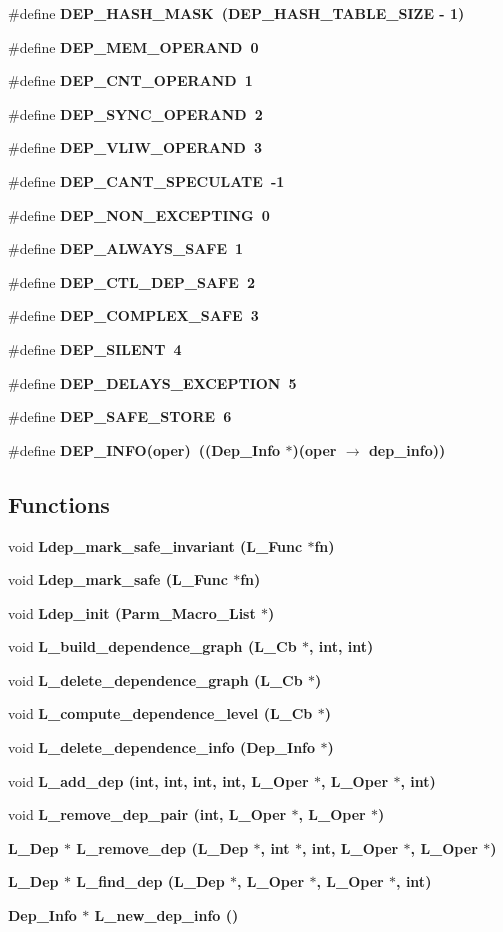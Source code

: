 \begin{CompactItemize}
\#define \bf{DEP\_\-HASH\_\-MASK}~(DEP\_\-HASH\_\-TABLE\_\-SIZE - 1)
\item 
\#define \bf{DEP\_\-MEM\_\-OPERAND}~0
\item 
\#define \bf{DEP\_\-CNT\_\-OPERAND}~1
\item 
\#define \bf{DEP\_\-SYNC\_\-OPERAND}~2
\item 
\#define \bf{DEP\_\-VLIW\_\-OPERAND}~3
\item 
\#define \bf{DEP\_\-CANT\_\-SPECULATE}~-1
\item 
\#define \bf{DEP\_\-NON\_\-EXCEPTING}~0
\item 
\#define \bf{DEP\_\-ALWAYS\_\-SAFE}~1
\item 
\#define \bf{DEP\_\-CTL\_\-DEP\_\-SAFE}~2
\item 
\#define \bf{DEP\_\-COMPLEX\_\-SAFE}~3
\item 
\#define \bf{DEP\_\-SILENT}~4
\item 
\#define \bf{DEP\_\-DELAYS\_\-EXCEPTION}~5
\item 
\#define \bf{DEP\_\-SAFE\_\-STORE}~6
\item 
\#define \bf{DEP\_\-INFO}(oper)~((\bf{Dep\_\-Info} $\ast$)(oper $\rightarrow$ dep\_\-info))
\end{CompactItemize}
\subsection*{Functions}
\begin{CompactItemize}
\item 
void \bf{Ldep\_\-mark\_\-safe\_\-invariant} (L\_\-Func $\ast$fn)
\item 
void \bf{Ldep\_\-mark\_\-safe} (L\_\-Func $\ast$fn)
\item 
void \bf{Ldep\_\-init} (\bf{Parm\_\-Macro\_\-List} $\ast$)
\item 
void \bf{L\_\-build\_\-dependence\_\-graph} (L\_\-Cb $\ast$, int, int)
\item 
void \bf{L\_\-delete\_\-dependence\_\-graph} (L\_\-Cb $\ast$)
\item 
void \bf{L\_\-compute\_\-dependence\_\-level} (L\_\-Cb $\ast$)
\item 
void \bf{L\_\-delete\_\-dependence\_\-info} (\bf{Dep\_\-Info} $\ast$)
\item 
void \bf{L\_\-add\_\-dep} (int, int, int, int, L\_\-Oper $\ast$, L\_\-Oper $\ast$, int)
\item 
void \bf{L\_\-remove\_\-dep\_\-pair} (int, L\_\-Oper $\ast$, L\_\-Oper $\ast$)
\item 
\bf{L\_\-Dep} $\ast$ \bf{L\_\-remove\_\-dep} (\bf{L\_\-Dep} $\ast$, int $\ast$, int, L\_\-Oper $\ast$, L\_\-Oper $\ast$)
\item 
\bf{L\_\-Dep} $\ast$ \bf{L\_\-find\_\-dep} (\bf{L\_\-Dep} $\ast$, L\_\-Oper $\ast$, L\_\-Oper $\ast$, int)
\item 
\bf{Dep\_\-Info} $\ast$ \bf{L\_\-new\_\-dep\_\-info} ()
\end{CompactItemize}
